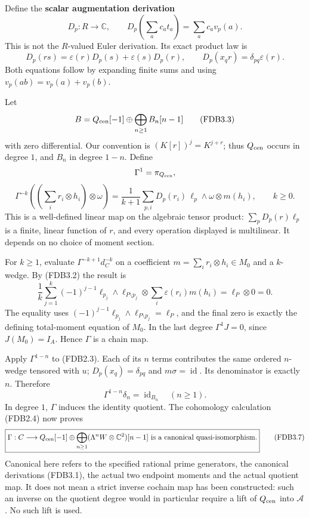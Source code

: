 Define the \textbf{scalar augmentation derivation} \[
D_p:R\to\mathbb C,\qquad
D_p\left(\sum_ac_at_a\right)=\sum_ac_av_p(a).
\tag{FDB3.1}
\] This is not the \(R\)-valued Euler derivation. Its exact product law
is \[
D_p(rs)=\varepsilon(r)D_p(s)+\varepsilon(s)D_p(r),
\qquad D_p(x_qr)=\delta_{pq}\varepsilon(r).
\tag{FDB3.2}
\] Both equations follow by expanding finite sums and using
\(v_p(ab)=v_p(a)+v_p(b)\).

Let \[
B=Q_{\rm cen}[-1]\oplus\bigoplus_{n\ge1}B_n[n-1]
\tag{FDB3.3}
\] with zero differential. Our convention is \((K[r])^j=K^{j+r}\); thus
\(Q_{\rm cen}\) occurs in degree \(1\), and \(B_n\) in degree \(1-n\).
Define \[
\Gamma^1=\pi_{Q_{\rm cen}},
\] \[
\Gamma^{-k}\left(\left(\sum_i r_i\otimes h_i\right)\otimes\omega\right)
=\frac1{k+1}\sum_{p,i}D_p(r_i)
\,\ell_p\wedge\omega\otimes m(h_i),\qquad k\ge0.
\tag{FDB3.4}
\] This is a well-defined linear map on the algebraic tensor product:
\(\sum_pD_p(r)\ell_p\) is a finite, linear function of \(r\), and every
operation displayed is multilinear. It depends on no choice of moment
section.

For \(k\ge1\), evaluate \(\Gamma^{-k+1}d_C^{-k}\) on a coefficient
\(m=\sum_i r_i\otimes h_i\in M_0\) and a \(k\)-wedge. By (FDB3.2) the
result is \[
\frac1k\sum_{j=1}^k(-1)^{j-1}
\ell_{p_j}\wedge\ell_{P\setminus p_j}
\otimes\sum_i\varepsilon(r_i)m(h_i)
=\ell_P\otimes 0=0.
\tag{FDB3.5}
\] The equality uses
\((-1)^{j-1}\ell_{p_j}\wedge\ell_{P\setminus p_j}=\ell_P\), and the
final zero is exactly the defining total-moment equation of \(M_0\). In
the last degree \(\Gamma^1J=0\), since \(J(M_0)=I_A\). Hence \(\Gamma\)
is a chain map.

Apply \(\Gamma^{1-n}\) to (FDB2.3). Each of its \(n\) terms contributes
the same ordered \(n\)-wedge tensored with \(u\);
\(D_p(x_q)=\delta_{pq}\) and \(m\sigma=\operatorname{id}\). Its
denominator is exactly \(n\). Therefore \[
\Gamma^{1-n}\delta_n=\operatorname{id}_{B_n}\quad(n\ge1).
\tag{FDB3.6}
\] In degree \(1\), \(\Gamma\) induces the identity quotient. The
cohomology calculation (FDB2.4) now proves \[
\boxed{\Gamma:C\longrightarrow
Q_{\rm cen}[-1]\oplus\bigoplus_{n\ge1}
(\Lambda^nW\otimes\mathbb C^2)[n-1]
\text{ is a canonical quasi-isomorphism}.}
\tag{FDB3.7}
\] Canonical here refers to the specified rational prime generators, the
canonical derivations (FDB3.1), the actual two endpoint moments and the
actual quotient map. It does not mean a strict inverse cochain map has
been constructed: such an inverse on the quotient degree would in
particular require a lift of \(Q_{\rm cen}\) into \(\mathcal A\). No
such lift is used.

